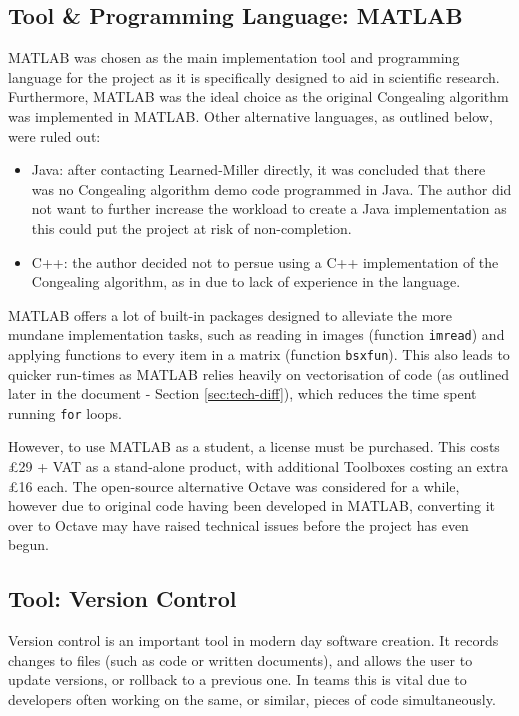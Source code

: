 \subsection{Tool \& Programming Language: MATLAB}
\label{ssec:matlab}

MATLAB \cite{MATLAB:2016} was chosen as the main implementation tool and programming language for the project as it is specifically designed to aid in scientific research. Furthermore, MATLAB was the ideal choice as the original \Gls{Congealing} algorithm was implemented in MATLAB. Other alternative languages, as outlined below, were ruled out:

\begin{itemize}
  \item Java: after contacting Learned-Miller directly, it was concluded that there was no \Gls{Congealing} algorithm demo code programmed in Java. The author did not want to further increase the workload to create a Java implementation as this could put the project at risk of non-completion.
  \item C++: the author decided not to persue using a C++ implementation of the \Gls{Congealing} algorithm, as in \cite{cpp_congealing} due to lack of experience in the language.
\end{itemize}

MATLAB offers a lot of built-in packages designed to alleviate the more mundane implementation tasks, such as reading in images (function \texttt{imread}) and applying functions to every item in a matrix (function \texttt{bsxfun}). This also leads to quicker run-times as MATLAB relies heavily on vectorisation of code (as outlined later in the document - Section \ref{sec:tech-diff}), which reduces the time spent running \texttt{for} loops.

However, to use MATLAB as a student, a license must be purchased. This costs \pounds29 + VAT as a stand-alone product, with additional Toolboxes costing an extra \pounds16 each. The open-source alternative Octave \cite{octave} was considered for a while, however due to original code having been developed in MATLAB, converting it over to Octave may have raised technical issues before the project has even begun.

\subsection{Tool: Version Control}

Version control is an important tool in modern day software creation. It records changes to files (such as code or written documents), and allows the user to update versions, or rollback to a previous one. In teams this is vital due to developers often working on the same, or similar, pieces of code simultaneously.

